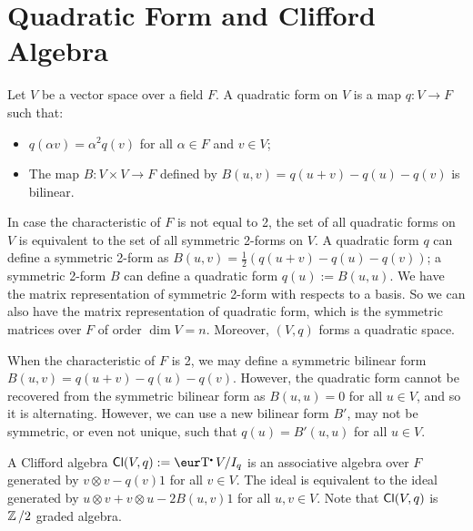 \section{Quadratic Form and Clifford Algebra}

Let $V$ be a vector space over a field $F$. A quadratic form on $V$ is a map $q : V \to F$ such that:
\begin{itemize}
	\item $q(\alpha v) = \alpha^2 q(v)$ for all $\alpha \in F$ and $v \in V$;
	\item The map $B : V \times V \to F$ defined by $B(u, v) = q(u + v) - q(u) - q(v)$ is bilinear.
\end{itemize}
In case the characteristic of $F$ is not equal to 2, the set of all quadratic forms on $V$ is equivalent to the set of all symmetric 2-forms on $V$. A quadratic form $q$ can define a symmetric 2-form as $B(u, v) = \frac{1}{2} (q(u + v) - q(u) - q(v))$; a symmetric 2-form $B$ can define a quadratic form $q(u) := B(u, u)$. We have the matrix representation of symmetric 2-form with respects to a basis. So we can also have the matrix representation of quadratic form, which is the symmetric matrices over $F$ of order $\dim V = n$. Moreover, $(V, q)$ forms a quadratic space.

\begin{remark}
	When the characteristic of $F$ is 2, we may define a symmetric bilinear form $B(u, v) = q(u + v) - q(u) - q(v)$. However, the quadratic form cannot be recovered from the symmetric bilinear form as $B(u, u) = 0$ for all $u \in V$, and so it is alternating. However, we can use a new bilinear form $B'$, may not be symmetric, or even not unique, such that $q(u) = B'(u, u)$ for all $u \in V$.
\end{remark}

A Clifford algebra $\Cl(V, q) := \T V / I_q$ is an associative algebra over $F$ generated by $v \otimes v - q(v) 1$ for all $v \in V$. The ideal is equivalent to the ideal generated by $u \otimes v + v \otimes u - 2 B(u, v) 1$ for all $u, v \in V$. Note that $\operatorname{\text{\normalfont\sffamily Cl}} (V, q)$ is $\operatorname{\mathbb{Z}} \mathbin{/} 2$ graded algebra.

